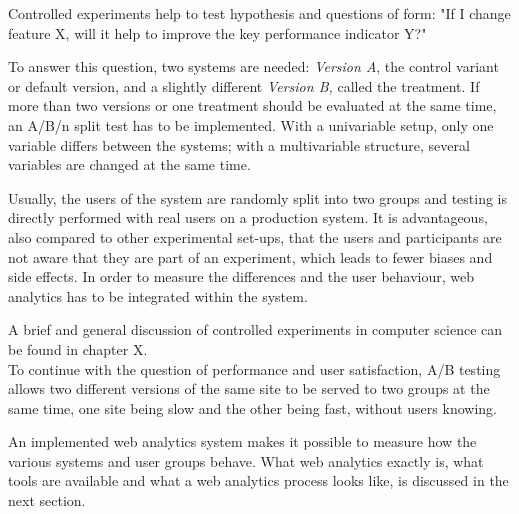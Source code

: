 Controlled experiments help to test hypothesis and questions of form: "If I change feature X, will it help to improve the key performance indicator Y?"

To answer this question,  two systems are needed: \textit{Version A}, the control variant or default version, and a slightly different \textit{Version B,} called the treatment.
If more than two versions or one treatment should be evaluated at the same time,  an A/B/n split test has to be implemented.
With a univariable setup, only one variable differs between the systems; with a multivariable structure, several variables are changed at the same time.

Usually, the users of the system are randomly split into two groups and testing is directly performed with real users on a production system.
It is advantageous, also compared to other experimental set-ups, that the users and participants are not aware that they are part of an experiment, which leads to fewer biases and side effects.
In order to measure the differences and the user behaviour, web analytics has to be integrated within the system. %

A brief and general discussion of controlled experiments in computer science can be found in chapter X.  %
\\

To continue with the question of performance and user satisfaction, A/B testing allows two different versions of the same site to be served to two groups at the same time, one site being slow and the other being fast, without users knowing.

An implemented web analytics system makes it possible to measure how the various systems and user groups behave.
What web analytics exactly is, what tools are available and what a web analytics process looks like, is discussed in the next section.




